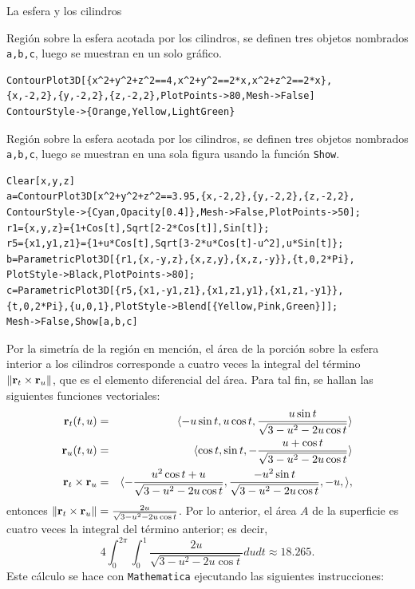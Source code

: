 \begin{parrafonumerado}
\item La esfera y los cilindros

Región sobre la esfera acotada por los cilindros, se definen tres objetos nombrados \verb"a,b,c", luego se muestran en un solo gráfico.

\begin{tcolorbox}[title=\bf Instrucción en \verb"Mathematica"]\begin{Verbatim}[formatcom=\letraverbatim]
ContourPlot3D[{x^2+y^2+z^2==4,x^2+y^2==2*x,x^2+z^2==2*x},
{x,-2,2},{y,-2,2},{z,-2,2},PlotPoints->80,Mesh->False]
ContourStyle->{Orange,Yellow,LightGreen}
\end{Verbatim}
\end{tcolorbox}

Región sobre la esfera acotada por los cilindros, se definen tres objetos nombrados \verb"a,b,c", luego se muestran en una sola figura usando la función \verb"Show".

\begin{tcolorbox}[title=\bf Instrucción en \verb"Mathematica"]\begin{Verbatim}[formatcom=\letraverbatim]
Clear[x,y,z]
a=ContourPlot3D[x^2+y^2+z^2==3.95,{x,-2,2},{y,-2,2},{z,-2,2},
ContourStyle->{Cyan,Opacity[0.4]},Mesh->False,PlotPoints->50];
r1={x,y,z}={1+Cos[t],Sqrt[2-2*Cos[t]],Sin[t]};
r5={x1,y1,z1}={1+u*Cos[t],Sqrt[3-2*u*Cos[t]-u^2],u*Sin[t]};
b=ParametricPlot3D[{r1,{x,-y,z},{x,z,y},{x,z,-y}},{t,0,2*Pi},
PlotStyle->Black,PlotPoints->80];
c=ParametricPlot3D[{r5,{x1,-y1,z1},{x1,z1,y1},{x1,z1,-y1}},
{t,0,2*Pi},{u,0,1},PlotStyle->Blend[{Yellow,Pink,Green}]];
Mesh->False,Show[a,b,c]
\end{Verbatim}
\end{tcolorbox}

Por la simetría de la región en mención, el área de la porción sobre la esfera interior a los cilindros corresponde a cuatro veces la integral del término
$\left\Vert {\bf r}_{t}\times {\bf r}_{u}\right\Vert$, que es el elemento diferencial del área.
Para tal fin, se hallan las siguientes funciones vectoriales:
\begin{eqnarray*}
{\bf r}_{t}(t,u) &=& \langle -u\sin t,u\cos t,\frac{u\sin t}{\sqrt{3-u^2 -2u\cos t}}\rangle \\
{\bf r}_{u}(t,u)&=& \langle\cos t,\sin t,-\frac{u+\cos t}{\sqrt{3-u^2-2u\cos t}}\rangle \\
{\bf r}_{t}\times{\bf r}_{u}&=&\langle-\frac{u^2 \cos t+u}{\sqrt{3-u^2 -2u\cos t}},\frac{-u^2 \sin t}{\sqrt{3-u^2 -2u\cos t}},-u,\rangle,
\end{eqnarray*}
entonces
$\left\Vert {\bf r}_{t}\times{\bf r}_{u} \right\Vert =\frac{2u}{\sqrt{3-u^{2}-2u\cos t}}$.
Por lo anterior, el área $A$ de la superficie es cuatro veces la integral del término anterior; es decir,
\[4\int_{0}^{2\pi}\int_{0}^{1}\frac{2u}{\sqrt{3-u^{2}-2u\cos t}}dudt \approx 18. 265.\]
Este cálculo se hace con \verb"Mathematica" ejecutando las siguientes instrucciones:


\end{parrafonumerado}

